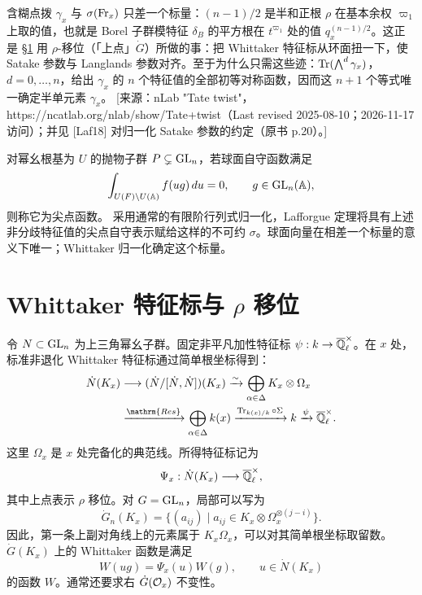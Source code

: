 \begin{transnote}{含糊点拨}
$\gamma_x$ 与 $\sigma(\operatorname{Fr}_x)$ 只差一个标量：$(n-1)/2$ 是半和正根 $\rho$ 在基本余权 $\varpi_1$ 上取的值，也就是 Borel 子群模特征 $\delta_B$ 的平方根在 $t^{\varpi_1}$ 处的值 $q_x^{(n-1)/2}$。这正是 \S\ref{sec:3.3} 用 $\rho$-移位（「上点」$\dot G$）所做的事：把 Whittaker 特征标从环面扭一下，使 Satake 参数与 Langlands 参数对齐。至于为什么只需这些迹：$\operatorname{Tr}(\bigwedge^d\gamma_x)$，$d=0,\ldots,n$，给出 $\gamma_x$ 的 $n$ 个特征值的全部初等对称函数，因而这 $n+1$ 个等式唯一确定半单元素 $\gamma_x$。
[来源：nLab "Tate twist"，https://ncatlab.org/nlab/show/Tate+twist（Last revised 2025-08-10；2026-11-17 访问）；并见 [Laf18] 对归一化 Satake 参数的约定（原书 p.20）。]
\end{transnote}

对幂幺根基为 $U$ 的抛物子群 $P\subsetneq\operatorname{GL}_n$，若球面自守函数满足
\[\int_{U(F)\backslash U(\mathbb{A})}f(ug)\,du=0,\qquad g\in\operatorname{GL}_n(\mathbb{A}),\]
则称它为尖点函数。
采用通常的有限阶行列式归一化，Lafforgue 定理将具有上述非分歧特征值的尖点自守表示赋给这样的不可约 $\sigma$\cite{Laf18}。球面向量在相差一个标量的意义下唯一；Whittaker 归一化确定这个标量。
\section{Whittaker 特征标与 \texorpdfstring{$\rho$}{ρ} 移位}\label{sec:3.3}
令 $N\subset\operatorname{GL}_n$ 为上三角幂幺子群。固定非平凡加性特征标 $\psi:k\to\overline{\mathbb{Q}}_{\ell}^\times$。在 $x$ 处，标准非退化 Whittaker 特征标通过简单根坐标得到：
\[
\begin{aligned}
\dot N(K_x)&\longrightarrow(\dot N/[\dot N,\dot N])(K_x)
\xrightarrow{\sim}\bigoplus_{\alpha\in\Delta}K_x\otimes\Omega_x\\
&\xrightarrow{\mathrm{Res}}\bigoplus_{\alpha\in\Delta}k(x)
\xrightarrow{\Tr_{k(x)/k}\circ\Sigma}k\xrightarrow{\psi}\Qell^\times.
\end{aligned}
\]
这里 $\Omega_x$ 是 $x$ 处完备化的典范线。所得特征标记为
\[\Psi_x:\dot N(K_x)\longrightarrow\overline{\mathbb{Q}}_{\ell}^\times,\]
其中上点表示 $\rho$ 移位。对 $G=\operatorname{GL}_n$，局部可以写为
\[\dot G_n(K_x)=\{(a_{ij})\mid a_{ij}\in K_x\otimes\Omega_x^{\otimes(j-i)}\}.\]
因此，第一条上副对角线上的元素属于 $K_x\Omega_x$，可以对其简单根坐标取留数。$\dot G(K_x)$ 上的 Whittaker 函数是满足
\[W(ug)=\Psi_x(u)W(g),\qquad u\in\dot N(K_x)\]
的函数 $W$。通常还要求右 $\dot G(\mathcal{O}_x)$ 不变性。
